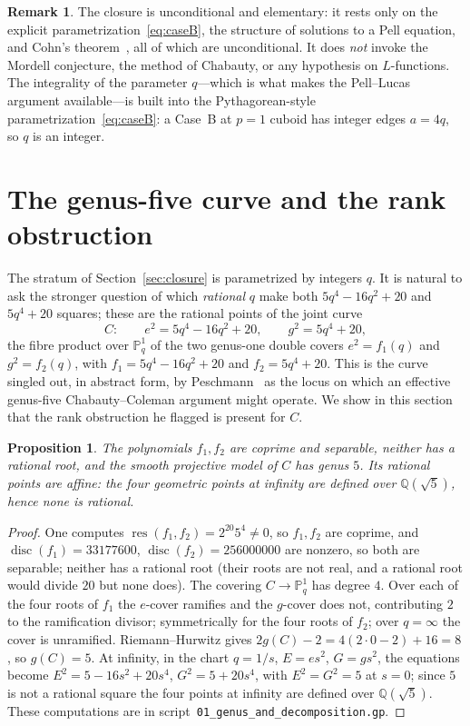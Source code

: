 \documentclass[11pt,reqno]{amsart}
\theoremstyle{plain}
\newtheorem{proposition}[theorem]{Proposition}
\theoremstyle{definition}
\newtheorem{remark}[theorem]{Remark}
\newcommand{\Q}{\mathbb{Q}}
\begin{document}
\begin{remark}
The closure is unconditional and elementary: it rests only on the explicit
parametrization~\eqref{eq:caseB}, the structure of solutions to a Pell equation,
and Cohn's theorem~\cite{cohn,cohnlucas}, all of which are unconditional. It does
\emph{not} invoke the Mordell conjecture, the method of Chabauty, or any
hypothesis on $L$-functions. The integrality of the parameter $q$---which is
what makes the Pell--Lucas argument available---is built into the
Pythagorean-style parametrization~\eqref{eq:caseB}: a Case~B at $p=1$ cuboid has
integer edges $a=4q$, so $q$ is an integer.
\end{remark}

\section{The genus-five curve and the rank obstruction}\label{sec:curve}

The stratum of Section~\ref{sec:closure} is parametrized by integers $q$. It is
natural to ask the stronger question of which \emph{rational} $q$ make both
$5q^4-16q^2+20$ and $5q^4+20$ squares; these are the rational points of the
joint curve
\begin{equation}\label{eq:C}
C:\qquad e^2=5q^4-16q^2+20,\qquad g^2=5q^4+20 ,
\end{equation}
the fibre product over $\mathbb{P}^1_q$ of the two genus-one double covers
$e^2=f_1(q)$ and $g^2=f_2(q)$, with $f_1=5q^4-16q^2+20$ and $f_2=5q^4+20$. This
is the curve singled out, in abstract form, by Peschmann~\cite[\S8]{peschmann}
as the locus on which an effective genus-five Chabauty--Coleman argument might
operate. We show in this section that the rank obstruction he flagged is
present for $C$.

\begin{proposition}\label{prop:genus}
The polynomials $f_1,f_2$ are coprime and separable, neither has a rational
root, and the smooth projective model of $C$ has genus $5$. Its rational points
are affine: the four geometric points at infinity are defined over
$\Q(\sqrt5)$, hence none is rational.
\end{proposition}

\begin{proof}
One computes $\operatorname{res}(f_1,f_2)=2^{20}5^4\neq0$, so $f_1,f_2$ are
coprime, and $\operatorname{disc}(f_1)=33177600$,
$\operatorname{disc}(f_2)=256000000$ are nonzero, so both are separable; neither
has a rational root (their roots are not real, and a rational root would divide
$20$ but none does). The covering $C\to\mathbb{P}^1_q$ has degree $4$. Over each
of the four roots of $f_1$ the $e$-cover ramifies and the $g$-cover does not,
contributing $2$ to the ramification divisor; symmetrically for the four roots
of $f_2$; over $q=\infty$ the cover is unramified. Riemann--Hurwitz gives
$2g(C)-2=4(2\cdot0-2)+16=8$, so $g(C)=5$. At infinity, in the chart
$q=1/s$, $E=es^2$, $G=gs^2$, the equations become $E^2=5-16s^2+20s^4$,
$G^2=5+20s^4$, with $E^2=G^2=5$ at $s=0$; since $5$ is not a rational square the
four points at infinity are defined over $\Q(\sqrt5)$. These computations are in
script~\texttt{01\_genus\_and\_decomposition.gp}.
\end{proof}
\end{document}
